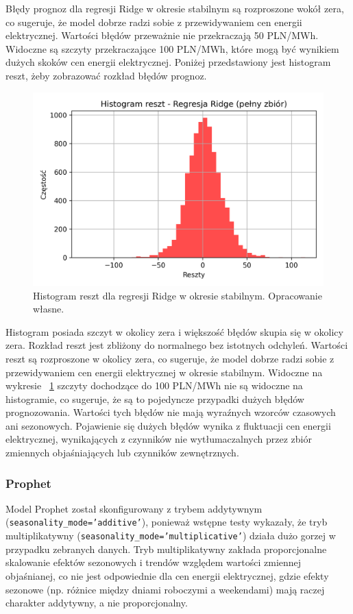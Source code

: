 Błędy prognoz dla regresji Ridge w okresie stabilnym są rozproszone wokół zera, co sugeruje, że model dobrze radzi sobie z przewidywaniem cen energii elektrycznej. Wartości błędów przeważnie nie przekraczają 50 PLN/MWh. Widoczne są szczyty przekraczające 100 PLN/MWh, które mogą być wynikiem dużych skoków cen energii elektrycznej. Poniżej przedstawiony jest histogram reszt, żeby zobrazować rozkład błędów prognoz.

\begin{figure}[H]
    \centering
    \includegraphics[width=1.0\textwidth]{../../plots/predicts/residuals_histogram_Ridge_full_stable_period.png}
    \caption{Histogram reszt dla regresji Ridge w okresie stabilnym. Opracowanie własne.}
    \label{fig:ridge_residuals_stable_period}
\end{figure}

Histogram posiada szczyt w okolicy zera i większość błędów skupia się w okolicy zera. Rozkład reszt jest zbliżony do normalnego bez istotnych odchyleń. Wartości reszt są rozproszone w okolicy zera, co sugeruje, że model dobrze radzi sobie z przewidywaniem cen energii elektrycznej w okresie stabilnym. Widoczne na wykresie ~\ref{fig:ridge_residuals_stable_period} szczyty dochodzące do 100 PLN/MWh nie są widoczne na histogramie, co sugeruje, że są to pojedyncze przypadki dużych błędów prognozowania. Wartości tych błędów nie mają wyraźnych wzorców czasowych ani sezonowych. Pojawienie się dużych błędów wynika z fluktuacji cen energii elektrycznej, wynikających z czynników nie wytłumaczalnych przez zbiór zmiennych objaśniających lub czynników zewnętrznych.

\subsubsection{Prophet}
Model Prophet został skonfigurowany z trybem addytywnym (\texttt{seasonality\_mode='additive'}), ponieważ wstępne testy wykazały, że tryb multiplikatywny (\texttt{seasonality\_mode='multiplicative'}) działa dużo gorzej w przypadku zebranych danych. Tryb multiplikatywny zakłada proporcjonalne skalowanie efektów sezonowych i trendów względem wartości zmiennej objaśnianej, co nie jest odpowiednie dla cen energii elektrycznej, gdzie efekty sezonowe (np. różnice między dniami roboczymi a weekendami) mają raczej charakter addytywny, a nie proporcjonalny.

